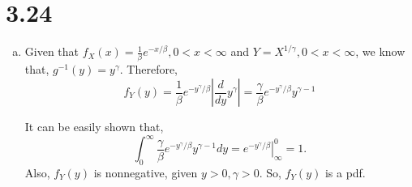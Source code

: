 \documentclass[letterpaper]{article}
\newcommand{\intzi}{\int_0^\infty}
\begin{document}
    \section*{3.24}
    \begin{enumerate}[(a)]
    \item Given that $f_X(x) = \frac{1}{\beta} e^{-x/\beta}, 0 < x <\infty$ and $Y = X^{1/\gamma}, 0 < x < \infty$, we know that, $g^{-1}(y) = y^\gamma$.
    Therefore,
    \[
    f_Y(y) = \frac{1}{\beta} e^{-y^\gamma/\beta} \left| \frac{d}{dy} y^\gamma \right| = \frac{\gamma}{\beta} e^{-y^\gamma/\beta} y^{\gamma-1}
    \]

    It can be easily shown that,
    \[
    \intzi \frac{\gamma}{\beta} e^{-y^\gamma/\beta} y^{\gamma-1} dy = \left. e^{-y^\gamma/\beta} \right|^0_\infty = 1.
    \]
    Also, $f_Y(y)$ is nonnegative, given $y > 0, \gamma > 0$. So, $f_Y(y)$ is a pdf.


\end{enumerate}
\end{document}
